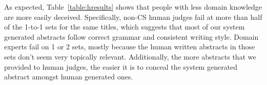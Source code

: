 \documentclass[11pt,a4paper]{article}
\begin{document}
As expected, Table~\ref{table:hresults} shows that people with less domain knowledge are more easily deceived. Specifically, non-CS human judges fail at more than half of the 1-to-1 sets for the same titles, which suggests that most of our system generated abstracts follow correct grammar and consistent writing style. Domain experts fail on 1 or 2 sets, mostly because the human written abstracts in those sets don't seem very topically relevant. Additionally, the more abstracts that we provided to human judges, the easier it is to conceal the system generated abstract amongst human generated ones. 
\end{document}
